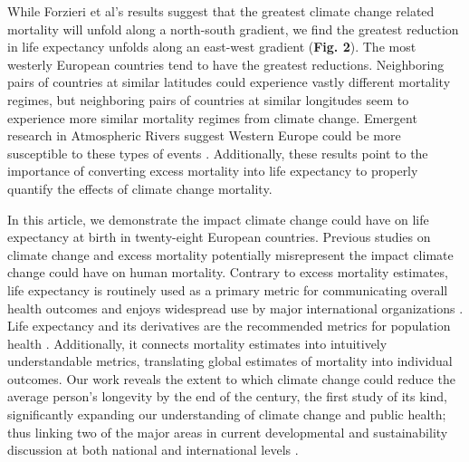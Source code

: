 \documentclass[12pt,]{article}
\begin{document}
While Forzieri et al's \citep{forzieri2017increasing} results suggest
that the greatest climate change related mortality will unfold along a
north-south gradient, we find the greatest reduction in life expectancy
unfolds along an east-west gradient (\textbf{Fig. 2}). The most westerly
European countries tend to have the greatest reductions. Neighboring
pairs of countries at similar latitudes could experience vastly
different mortality regimes, but neighboring pairs of countries at
similar longitudes seem to experience more similar mortality regimes
from climate change. Emergent research in Atmospheric Rivers suggest
Western Europe could be more susceptible to these types of events
\citep{ramos2015daily}. Additionally, these results point to the
importance of converting excess mortality into life expectancy to
properly quantify the effects of climate change mortality.

In this article, we demonstrate the impact climate change could have on
life expectancy at birth in twenty-eight European countries. Previous
studies on climate change and excess mortality potentially misrepresent
the impact climate change could have on human mortality. Contrary to
excess mortality estimates, life expectancy is routinely used as a
primary metric for communicating overall health outcomes and enjoys
widespread use by major international organizations
\citep{world2015world, marmot2012building, salomon2012healthy}. Life
expectancy and its derivatives are the recommended metrics for
population health \citep{parrish2010peer}. Additionally, it connects
mortality estimates into intuitively understandable metrics, translating
global estimates of mortality into individual outcomes. Our work reveals
the extent to which climate change could reduce the average person's
longevity by the end of the century, the first study of its kind,
significantly expanding our understanding of climate change and public
health; thus linking two of the major areas in current developmental and
sustainability discussion at both national and international levels
\citep{abel2016meeting}.
\end{document}
